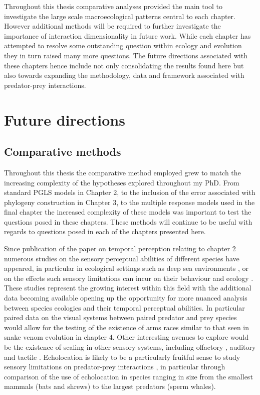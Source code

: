 Throughout this thesis comparative analyses provided the main tool to investigate the large scale macroecological patterns central to each chapter. However additional methods will be required to further investigate the importance of interaction dimensionality in future work. While each chapter has attempted to resolve some outstanding question within ecology and evolution they in turn raised many more questions. The future directions associated with these chapters hence include not only consolidating the results found here but also towards expanding the methodology, data and framework associated with predator-prey interactions.


\section{\uppercase{F}uture directions}

\subsection{Comparative methods}


Throughout this thesis the comparative method employed grew to match the increasing complexity of the hypotheses explored throughout my PhD. From standard PGLS models in Chapter 2, to the inclusion of the error associated with phylogeny construction in Chapter 3, to the multiple response models used in the final chapter the increased complexity of these models was important to test the questions posed in these chapters. These methods will continue to be useful with regards to questions posed in each of the chapters presented here. 

Since publication of the paper on temporal perception relating to chapter 2 \citep{healy2013metabolic} numerous studies on the sensory perceptual abilities of different species have appeared, in particular in ecological settings such as deep sea environments \citep{kalinoski2014spectral,Wegner15052015,landgren2014visual}, or on the effects such sensory limitations can incur on their behaviour and ecology \citep{bar2015sensory,inger2014potential}. These studies represent the growing interest within this field with the additional data becoming available opening up the opportunity for more nuanced analysis between species ecologies and their temporal perceptual abilities. In particular paired data on the visual systems between paired predator and prey species would allow for the testing of the existence of arms races similar to that seen in snake venom evolution in chapter 4. Other interesting avenues to explore would be the existence of scaling in other sensory systems, including olfactory \citep{uchida2003speed}, auditory \citep{bar2015sensory} and tactile \citep{braam2005touch}. Echolocation is likely to be a particularly fruitful sense to study sensory limitations on predator-prey interactions \citep{bar2015sensory}, in particular through comparison of the use of echolocation in species ranging in size from the smallest mammals (bats and shrews) to the largest predators (sperm whales).


